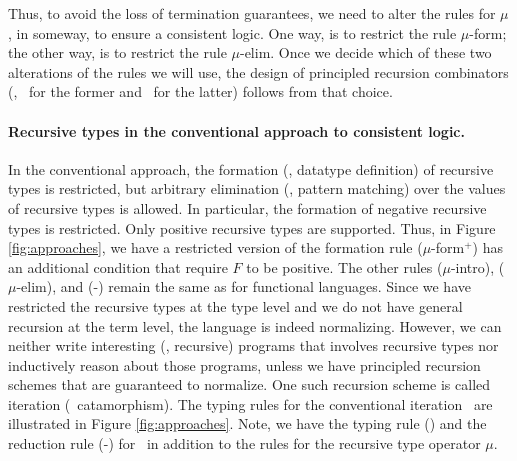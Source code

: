 Thus, to avoid the loss of termination guarantees, we need to alter the rules
for $\mu$, in someway, to ensure a consistent logic. One way, is to restrict
the rule {\small $\mu$-form}; the other way, is to restrict the rule
{\small $\mu$-elim}. Once we decide which of these two alterations of the
rules we will use, the design of principled recursion combinators (\eg, \It\
for the former and \MIt\ for the latter) follows from that choice.

\paragraph{Recursive types in the conventional approach to consistent logic.}
In the conventional approach, the formation (\ie, datatype definition) of
recursive types is restricted, but arbitrary elimination (\ie, pattern matching)
over the values of recursive types is allowed. In particular, the formation of
negative recursive types is restricted. Only positive recursive types are
supported. Thus, in Figure \ref{fig:approaches}, we have a restricted version of
the formation rule {\small($\mu$-form$^{+}$)} has an additional condition that
require $F$ to be positive. The other rules {\small($\mu$-intro)},
{\small($\mu$-elim)}, and {\small(\unIn-\In)} remain the same as for
functional languages. Since we have restricted the recursive types
at the type level and we do not have general recursion at the term level,
the language is indeed normalizing. However, we can neither write
interesting (\ie, recursive) programs that involves recursive types nor
inductively reason about those programs, unless we have principled recursion
schemes that are guaranteed to normalize. One such recursion scheme is called
iteration (\aka\ catamorphism). The typing rules for the conventional iteration
\It\ are illustrated in Figure \ref{fig:approaches}. Note, we have the typing
rule {\small(\It)} and the reduction rule {\small(\It-\In)} for \It\,
in addition to the rules for the recursive type operator $\mu$.


